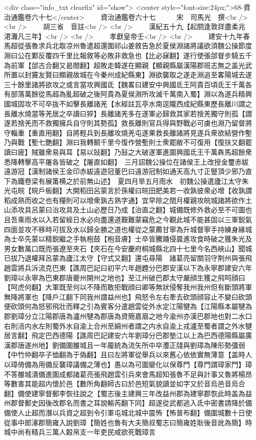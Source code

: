 <div class="info_txt clearfix" id="show">
<center style="font-size:24px;">68-資治通鑑卷六十七</center>
  　　資治通鑑卷六十七　　　宋　司馬光　撰<br />
<br />
　　胡三省　音註<br />
<br />
　　漢紀五十九【起閼逢敦牂盡柔兆涒灘凡三年】<br />
<br />
　　孝獻皇帝壬<br />
<br />
　　建安十九年春馬超從張魯求兵北取凉州魯遣超還圍祁山姜敘告急於夏侯淵諸將議欲須魏公操節度淵曰公在鄴反覆四千里比報敘等必敗非救急也【比必寐翻】遂行使張郃督步騎五千為前軍【郃古合翻又曷閤翻】超敗走韓遂在顯親【顯親縣屬漢陽郡班志無之盖光武所置以封竇友賢曰顯親故城在今秦州成紀縣東】淵欲襲取之遂走淵追至畧陽城去遂三十餘里諸將欲攻之或言當攻興國氐【魏畧曰建安中興國氐王阿貴百頃氐王千萬各有部落萬餘從馬超為亂超破之後阿貴為夏侯淵所攻滅千萬南入蜀】淵以為遂兵精興國城固攻不可卒抜不如擊長離諸羌【水經註瓦亭水南逕隴西成紀縣東歷長離川謂之長離水燒當等羌居之卒讀曰猝】長離諸羌多在遂軍必歸救其家若捨羌獨守則孤【謂遂若捨羌而不救獨擁兵自守則其勢孤】救長離則官兵得與野戰必可虜也淵乃留督將守輜重【重直用翻】自將輕兵到長離攻燒羌屯遂果救長離諸將見遂兵衆欲結營作塹乃與戰【塹七艷翻】淵曰我轉鬭千里今復作營塹則士衆罷敝不可復用【復扶又翻罷讀曰疲】賊雖衆易與耳【易以䜴翻】乃鼔之大破遂軍進圍興國氐王千萬犇馬超餘衆悉降轉擊高平屠各皆破之【屠直如翻】　三月詔魏公操位在諸侯王上改授金璽赤紱遠游冠【漢制諸侯王金印赤紱遠遊冠董巴曰遠游冠制如通天高九寸正豎頂少邪乃直下為鐵卷梁有展筩横之於前無山述】　夏四月旱五月雨水　初魏公操遣廬江太守朱光屯皖【皖戶板翻】大開稻田呂蒙言於孫權曰皖田肥美若一收孰彼衆必增【收孰謂稻成熟而收之也有糧則可以增衆孰古熟字通】宜早除之閏月權親攻皖城諸將欲作土山添攻具呂蒙曰治攻具及土山必歷日乃成【治直之翻】城備既修外救必至不可圖也且吾乘雨水以入若留經日水必向盡還道艱難蒙竊危之今觀此城不能甚固以三軍鋭氣四面並攻不移時可拔及水以歸全勝之道也權從之蒙薦甘寧為升城督寧手持練身緣城為士卒先蒙以精鋭繼之手執枹鼓【枹音膚】士卒皆騰踊侵晨進攻食時破之獲朱光及男女數萬口既而張遼至夾石【夾石在今安慶府桐城縣北四十七里今名西峽山】聞城已拔乃退權拜呂蒙為廬江太守【守式又翻】還屯尋陽　諸葛亮留關羽守荆州與張飛趙雲將兵泝流克巴東【譙周巴記曰初平六年趙韙分巴郡安漢以下為永寧郡建安六年劉璋以永寧為巴東郡唐夔州開州之地也】至江州破巴郡太守嚴顔生獲之飛呵顔曰【呵虎何翻】大軍既至何以不降而敢拒戰顔曰卿等無狀侵奪我州我州但有斷頭將軍無降將軍也【降戶江翻下同我州謂益州也】飛怒令左右牽去砍頭顔容止不變曰砍頭便砍頭何為怒邪飛壯而釋之引為賓客分遣趙雲從外水定江陽犍為【江陽縣本屬犍為郡劉璋分立江陽郡唐為瀘州犍為郡唐為資簡嘉眉之地今渝州亦漢巴郡地也對二水口右則涪内水左則蜀外水自渝上合州至綿州者謂之内水自渝上戎瀘至蜀者謂之外水犍居言翻】飛定巴西德陽【譙周巴記建安六年劉璋分巴郡墊江以上為巴西德陽縣屬廣漢郡唐遂州地】劉備圍雒城且一年龎統為流矢所中卒灋正牋與劉璋為陳形勢彊弱【中竹仲翻卒子恤翻為于偽翻】且曰左將軍從舉兵以來舊心依依實無薄意【盖時人以璋倚備為用備反襲璋議備之薄也】愚以為可圖變化以保尊門【尊門謂璋家門】璋不答雒城潰備進圍成都諸葛亮張飛趙雲引兵來會馬超知張魯不足與計事又魯將楊昂等數害其能超内懷於邑【數所角翻師古曰於邑短氣貌讀並如字又於音烏邑音烏合翻】備使建寧督郵李恢往說之【蜀志後主建興三年改益州郡為建寧郡恢此時盖為益州郡督郵史因後改郡名而書之耳說輸芮翻下同】超遂從武都逃入氐中密書請降於備備使人止超而潛以兵資之超到令引軍屯城北城中震怖【怖普布翻】備圍城數十日使從事中郎涿郡簡雍入說劉璋【簡姓也魯有大夫簡叔蜀志曰簡雍姓耿後音訛為簡】時城中尚有精兵三萬人糓帛支一年吏民咸欲死戰璋言